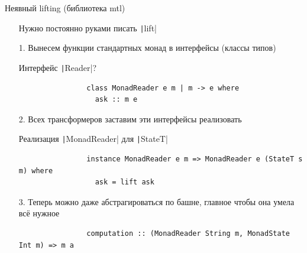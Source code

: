     \begin{frame}[fragile]{Неявный lifting (библиотека mtl)}
        \vspace{-0.5em}
        \begin{itemize}
            \item[\negative] Нужно постоянно руками писать \texttt|lift|
            \item[1.] Вынесем функции стандартных монад в интерфейсы (классы типов)
            \item[\todo] Интерфейс \texttt|Reader|?
            \item[\answer] \pause
            \begin{verbatim}
                class MonadReader e m | m -> e where
                  ask :: m e
            \end{verbatim}
            \item[2.] Всех трансформеров заставим эти интерфейсы реализовать
            \item[\todo]  Реализация \texttt|MonadReader| для \texttt|StateT|
            \item[\answer] \pause
            \begin{verbatim}
                instance MonadReader e m => MonadReader e (StateT s m) where
                  ask = lift ask
            \end{verbatim}
            \item[3.] Теперь можно даже абстрагироваться по башне, главное чтобы она умела всё нужное
            \begin{verbatim}
                computation :: (MonadReader String m, MonadState Int m) => m a
            \end{verbatim}
        \end{itemize}
    \end{frame}

